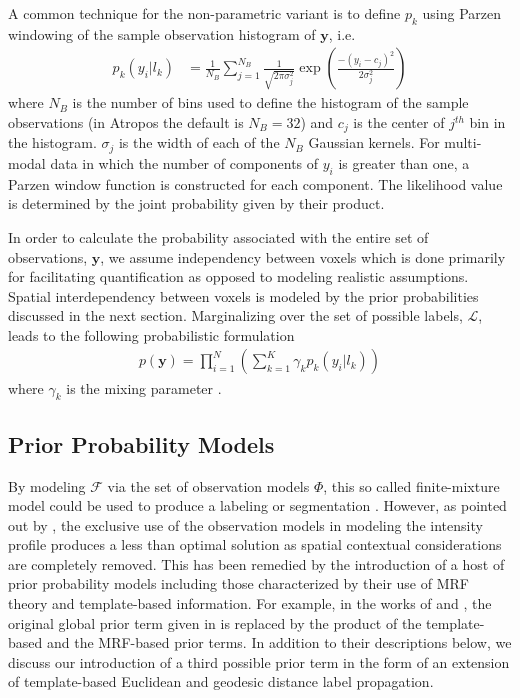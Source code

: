 \documentclass[11pt,english]{article}
\begin{document}
A common technique for the non-parametric variant is to define $p_k$ using Parzen windowing of the sample observation histogram of $\mathbf{y}$, i.e.
\begin{align} \label{eq:nonparam}
  p_k\left(y_i|l_k\right) &= \frac{1}{N_B} \sum_{j=1}^{N_B} \frac{1}{\sqrt{2\pi \sigma_j^2}}\exp\left( \frac{ -(y_i - c_j)^2 }{2\sigma_j^2} \right)
\end{align}
where $N_B$ is the number of bins used to define the histogram of the sample observations (in Atropos the default is $N_B = 32$) and $c_j$ is the center of $j^{th}$ bin in the histogram.  $\sigma_j$ is the width of each of the $N_B$ Gaussian kernels.  For multi-modal data in which the number of components of $y_i$ is greater than one, a Parzen window function is constructed for each component.  The likelihood value is determined by the joint probability given by their product.

In order to calculate the probability associated with the entire set of observations, $\mathbf{y}$, we assume independency between voxels which is done primarily for facilitating quantification as opposed to modeling realistic assumptions.  Spatial interdependency between voxels is modeled by the prior probabilities discussed in the next section.  Marginalizing over the set of possible labels, $\mathcal{L}$, leads to the following probabilistic formulation
\begin{align}\label{eq:likelihood}
  p(\mathbf{y}) = \prod_{i=1}^N \left(      
                                                        \sum_{k=1}^K \gamma_k p_k(y_i|l_k)
                                                        \right)
\end{align}
where $\gamma_k$ is the mixing parameter \cite{Ashburner2005}.  

\subsection{Prior Probability Models}

By modeling $\mathcal{F}$ via the set of observation models $\Phi$, this so called finite-mixture model could be used to produce a labeling or segmentation \citep[e.g.][]{Wells1996}.  However, as pointed out by \cite{Zhang2001}, the exclusive use of the observation models in modeling the intensity profile produces a less than optimal solution as spatial contextual considerations are completely removed.  This has been remedied by the introduction of a host of  prior probability models including those characterized by their use of MRF theory and template-based information.  For example, in the works of \cite{Leemput1999a} and \cite{Weisenfeld2009}, the original global prior term given in \cite{Wells1996} is replaced by the product of the template-based and the MRF-based prior terms.  In addition to their descriptions below, we discuss our introduction of a third possible prior term in the form of an extension of template-based Euclidean and geodesic distance label propagation.  
\end{document}
